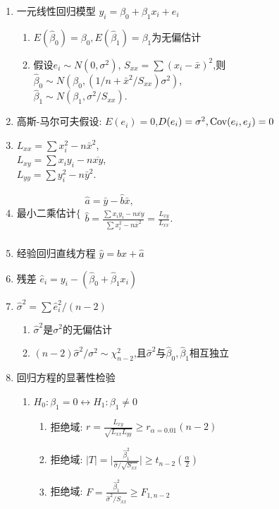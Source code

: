 \begin{enumerate}

\item 一元线性回归模型 $y_i=\beta_0+\beta_1x_i+e_i$
\begin{enumerate}[label={\sf 性质\arabic*}]
\item $E(\hat\beta_0)=\beta_0,E(\hat\beta_1)=\beta_1$为无偏估计
\item 假设$e_i\sim N(0,\sigma^2)$, $S_{xx}=\sum(x_i-\bar x)^2$,则\\
$\hat\beta_0\sim N(\beta_0,(1/n+\bar x^2/S_{xx})\sigma^2)$,\\
$\hat\beta_1\sim N(\beta_1,\sigma^2/S_{xx})$.
\end{enumerate}
\item 高斯-马尔可夫假设: $E(e_i)=0$,$D(e_i)=\sigma^2, \operatorname{Cov}(e_i,e_j)=0$
\item $L_{xx}=\sum x_i^2-n\bar x^2$,\\
$L_{xy}=\sum x_iy_i-n\overline{xy}$,\\
$L_{yy}=\sum y_i^2-n\bar y^2$.
\item 最小二乘估计$\Bigg\{\!\begin{array}{l}
\hat a=\bar{y}-\hat b\bar{x},\\
\hat b=\frac{\sum x_iy_i -n\overline{xy}}{\sum x_i^2-n\bar x^2}=\frac{L_{xy}}{L_{xx}}.\\
\end{array}$
\item 经验回归直线方程 $\hat y=\hat b x+\hat a$
\item 残差 $\hat e_i=y_i-(\hat\beta_0+\hat\beta_1x_i)$
\item $\hat\sigma^2=\sum\hat e^2_i/(n-2)$
\begin{enumerate}
\item $\hat\sigma^2$是$\sigma^2$的无偏估计
\item $(n-2)\hat\sigma^2/\sigma^2\sim\chi^2_{n-2}$,且$\hat\sigma^2$与$\hat\beta_0,\hat\beta_1$相互独立
\end{enumerate}

\item 回归方程的显著性检验
\begin{enumerate}
\item $H_0:\beta_1=0\leftrightarrow H_1:\beta_1\neq0$
\begin{enumerate}
\item 拒绝域: $r=\frac{L_{xy}}{\sqrt{L_{xx}L_{yy}}}\ge r_{\alpha=0.01}(n-2)$
\item 拒绝域: $|T|= \big|\frac{\hat\beta_1^2}{\hat\sigma/\sqrt{S_{xx}}}\big|\ge t_{n-2}(\frac{\alpha}{2})$
\item 拒绝域: $F=\frac{\hat\beta_1^2}{\hat\sigma^2/{S_{xx}}}\ge F_{1,n-2}$
\end{enumerate}
\end{enumerate}


\end{enumerate}
